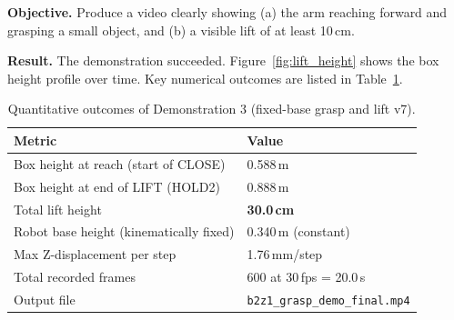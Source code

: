 \textbf{Objective.}  Produce a video clearly showing (a) the arm reaching
forward and grasping a small object, and (b) a visible lift of at least
10\,cm.

\textbf{Result.}  The demonstration succeeded.
Figure~\ref{fig:lift_height} shows the box height profile over time.
Key numerical outcomes are listed in Table~\ref{tab:demo3_results}.

\begin{table}[htbp]
  \centering
  \caption{Quantitative outcomes of Demonstration 3 (fixed-base grasp and lift v7).}
  \label{tab:demo3_results}
  \renewcommand{\arraystretch}{1.1}
  \begin{tabular}{ll}
    \toprule
    \textbf{Metric} & \textbf{Value} \\
    \midrule
    Box height at reach (start of CLOSE) & 0.588\,m \\
    Box height at end of LIFT (HOLD2)    & 0.888\,m \\
    Total lift height                    & \textbf{30.0\,cm} \\
    Robot base height (kinematically fixed) & 0.340\,m (constant) \\
    Max Z-displacement per step          & 1.76\,mm/step \\
    Total recorded frames                & 600 at 30\,fps = 20.0\,s \\
    Output file                          & \texttt{b2z1\_grasp\_demo\_final.mp4} \\
    \bottomrule
  \end{tabular}
\end{table}

